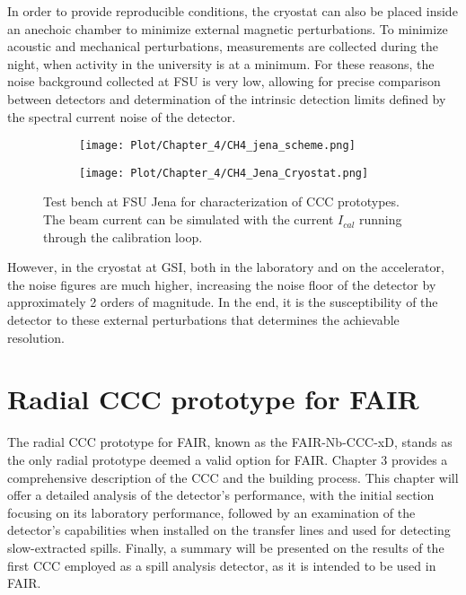 \documentclass[12pt,a4paper]{report}
\begin{document}
       In order to provide reproducible conditions, the cryostat can also be placed inside an anechoic chamber to minimize external magnetic perturbations. To minimize acoustic and mechanical perturbations, measurements are collected during the night, when activity in the university is at a minimum. For these reasons, the noise background collected at FSU is very low, allowing for precise comparison between detectors and determination of the intrinsic detection limits defined by the spectral current noise of the detector.
       \begin{figure}[H]
       	\begin{subfigure}[b]{0.6\textwidth}
       		\centering
       		\texttt{[image: Plot/Chapter\_4/CH4\_jena\_scheme.png]}
       	\end{subfigure}
       	\hfill
       	\begin{subfigure}[b]{0.35\textwidth}
       		\centering
       		\texttt{[image: Plot/Chapter\_4/CH4\_Jena\_Cryostat.png]}
       	\end{subfigure}
       	\caption{\small{Test bench at FSU Jena for characterization of CCC prototypes. The beam current can be simulated with the current $I_{cal}$ running through the calibration loop.}}
       	\label{CH4_jena_cryostat}
       \end{figure}
       However, in the cryostat at GSI, both in the laboratory and on the accelerator, the noise figures are much higher, increasing the noise floor of the detector by approximately 2 orders of magnitude. In the end, it is the susceptibility of the detector to these external perturbations that determines the achievable resolution.
       
       
       
       
        \chapter{Radial CCC prototype for FAIR}
       The radial CCC prototype for FAIR, known as the FAIR-Nb-CCC-xD, stands as the only radial prototype deemed a valid option for FAIR. Chapter 3 provides a comprehensive description of the CCC and the building process. This chapter will offer a detailed analysis of the detector's performance, with the initial section focusing on its laboratory performance, followed by an examination of the detector's capabilities when installed on the transfer lines and used for detecting slow-extracted spills. Finally, a summary will be presented on the results of the first CCC employed as a spill analysis detector, as it is intended to be used in FAIR.
       
\end{document}
